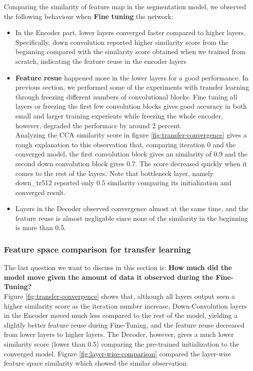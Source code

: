Comparing the similarity of feature map in the segmentation model, we observed the following behaviour when \textbf{Fine tuning} the network:
\begin{itemize}
	\item In the Encoder part, lower layers converged faster compared to higher layers. Specifically, down convolution reported higher similarity score from the beginning compared with the similarity score obtained when we trained from scratch, indicating the feature reuse in the encoder layers 
	\item \textbf{Feature resue} happened more in the lower layers for a good performance. In previous section, we performed some of the experiments with transfer learning through freezing different numbers of convolutional blocks. Fine tuning all layers or freezing the first few convolution blocks gives good accuracy in both small and larger training experients while freezing the whole encoder, however, degraded the performace by around 2 percent.\\
	
	 Analyzing the CCA similarity score in figure \ref{fig:transfer-convergence} gives a rough explanation to this observation that, comparing iteration 0 and the converged model, the first convolution block gives an similarity of 0.9 and the second down convolution block gives 0.7. The score decreased quickly when it comes to the rest of the layers. Note that bottleneck layer, namely down\_tr512 reported only 0.5 similarity comparing its initialization and converged result.
	\item Layers in the Decoder observed convergence almost at the same time, and the feature reuse is almost negligable since none of the similarity in the beginning is more than 0.5.
\end{itemize}

\subsubsection{Feature space comparison for transfer learning} 
The last question we want to discuss in this section is: \textbf{How much did the model move given the amount of data it observed during the Fine-Tuning?}\\

Figure \ref{fig:transfer-convergence} shows that, although all layers output seen a higher similarity score as the iteration number increase, 
Down-Convolution layers in the Encoder moved much less compared to the rest of the model, yielding a slightly better feature reuse during Fine-Tuning, and the feature reuse decreased from lower layers to higher layers. The Decoder, however, gives a much lower similarity score (lower than 0.5) comparing the pre-trained initialization to the converged model. Figure \ref{fig:layer-wise-comparison} compared the layer-wise feature space similarity which showed the similar observation.

